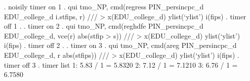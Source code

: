 . noisily timer on 1
{\smallskip}
. qui tmo_NP, cmd(regress PIN_persincpc_d EDU_college_d i.stfips, r) /// 
> x(EDU_college_d) ylist(`ylist') i(fips)
{\smallskip}
. timer off 1
{\smallskip}
. 
. timer on 2
{\smallskip}
. qui tmo_NP, cmd(reghdfe PIN_persincpc_d EDU_college_d, vce(r) abs(stfip
> s)) /// 
> x(EDU_college_d) ylist(`ylist') i(fips)
{\smallskip}
. timer off 2
{\smallskip}
. 
. timer on 3
{\smallskip}
. qui tmo_NP, cmd(areg PIN_persincpc_d EDU_college_d, r abs(stfips)) /// 
> x(EDU_college_d) ylist(`ylist') i(fips)
{\smallskip}
. timer off 3
{\smallskip}
. timer list
   1:      5.83 /        1 =       5.8320
   2:      7.12 /        1 =       7.1210
   3:      6.76 /        1 =       6.7580
{\smallskip}
